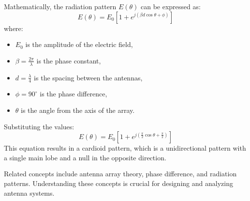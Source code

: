 Mathematically, the radiation pattern \( E(\theta) \) can be expressed as:
\[
E(\theta) = E_0 \left[ 1 + e^{j(\beta d \cos \theta + \phi)} \right]
\]
where:
\begin{itemize}
    \item \( E_0 \) is the amplitude of the electric field,
    \item \( \beta = \frac{2\pi}{\lambda} \) is the phase constant,
    \item \( d = \frac{\lambda}{4} \) is the spacing between the antennas,
    \item \( \phi = 90^\circ \) is the phase difference,
    \item \( \theta \) is the angle from the axis of the array.
\end{itemize}

Substituting the values:
\[
E(\theta) = E_0 \left[ 1 + e^{j\left(\frac{\pi}{2} \cos \theta + \frac{\pi}{2}\right)} \right]
\]
This equation results in a cardioid pattern, which is a unidirectional pattern with a single main lobe and a null in the opposite direction.

Related concepts include antenna array theory, phase difference, and radiation patterns. Understanding these concepts is crucial for designing and analyzing antenna systems.


